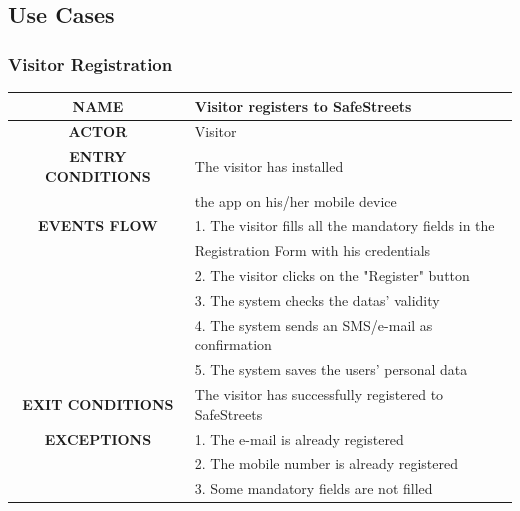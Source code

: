 \documentclass[12pt,a4paper]{article}
\begin{document}
\subsection{Use Cases}
	\subsubsection{Visitor Registration}
		\begin{center}
			\begin{tabular}{| c | l |}
				\hline
				\textbf{NAME} & Visitor registers to SafeStreets \\
				\hline
				\textbf{ACTOR} & Visitor \\
				\hline
				\textbf{ENTRY CONDITIONS} & The visitor has installed \\
				&	the app on his/her mobile device \\ \hline
				\textbf{EVENTS FLOW}  &
				1. The visitor fills all the mandatory fields in the\\
				& Registration Form with his credentials\\
				&2. The visitor clicks on the "Register" button\\
				&3. The system checks the datas' validity \\
				&4. The system sends an SMS/e-mail as confirmation\\
				&5. The system saves the users' personal data\\
				\hline
				\textbf{EXIT CONDITIONS}  & The visitor has successfully registered to SafeStreets\\ \hline
				\textbf{EXCEPTIONS} &
				1. The e-mail is already registered\\
				&2. The mobile number is already registered\\
				&3. Some mandatory fields are not filled\\
				\hline
			\end{tabular}
		\end{center}
\end{document}
